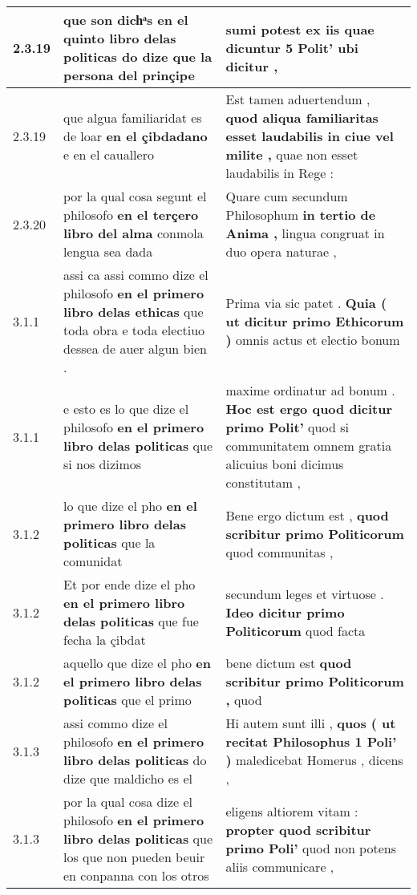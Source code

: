 \begin{tabular}{|p{1cm}|p{6.5cm}|p{6.5cm}|}
2.3.19 & que son dichͣs \textbf{ en el quinto libro delas politicas } do dize que la persona del prinçipe & sumi potest \textbf{ ex iis quae dicuntur 5 Polit’ } ubi dicitur , \\\hline
2.3.19 & que algua familiaridat es de loar \textbf{ en el çibdadano } e en el cauallero & Est tamen aduertendum , \textbf{ quod aliqua familiaritas esset laudabilis in ciue vel milite , } quae non esset laudabilis in Rege : \\\hline
2.3.20 & por la qual cosa segunt el philosofo \textbf{ en el terçero libro del alma } conmola lengua sea dada & Quare cum secundum Philosophum \textbf{ in tertio de Anima , } lingua congruat in duo opera naturae , \\\hline
3.1.1 & assi ca assi commo dize el philosofo \textbf{ en el primero libro delas ethicas } que toda obra e toda electiuo dessea de auer algun bien . & Prima via sic patet . \textbf{ Quia ( ut dicitur primo Ethicorum ) } omnis actus et electio bonum \\\hline
3.1.1 & e esto es lo que dize el philosofo \textbf{ en el primero libro delas politicas } que si nos dizimos & maxime ordinatur ad bonum . \textbf{ Hoc est ergo quod dicitur primo Polit’ } quod si communitatem omnem gratia alicuius boni dicimus constitutam , \\\hline
3.1.2 & lo que dize el pho \textbf{ en el primero libro delas politicas } que la comunidat & Bene ergo dictum est , \textbf{ quod scribitur primo Politicorum } quod communitas , \\\hline
3.1.2 & Et por ende dize el pho \textbf{ en el primero libro delas politicas } que fue fecha la çibdat & secundum leges et virtuose . \textbf{ Ideo dicitur primo Politicorum } quod facta \\\hline
3.1.2 & aquello que dize el pho \textbf{ en el primero libro delas politicas } que el primo & bene dictum est \textbf{ quod scribitur primo Politicorum , } quod \\\hline
3.1.3 & assi commo dize el philosofo \textbf{ en el primero libro delas politicas } do dize que maldicho es el & Hi autem sunt illi , \textbf{ quos ( ut recitat Philosophus 1 Poli’ ) } maledicebat Homerus , dicens , \\\hline
3.1.3 & por la qual cosa dize el philosofo \textbf{ en el primero libro delas politicas } que los que non pueden beuir en conpanna con los otros & eligens altiorem vitam : \textbf{ propter quod scribitur primo Poli’ } quod non potens aliis communicare , \\\hline

\end{tabular}
